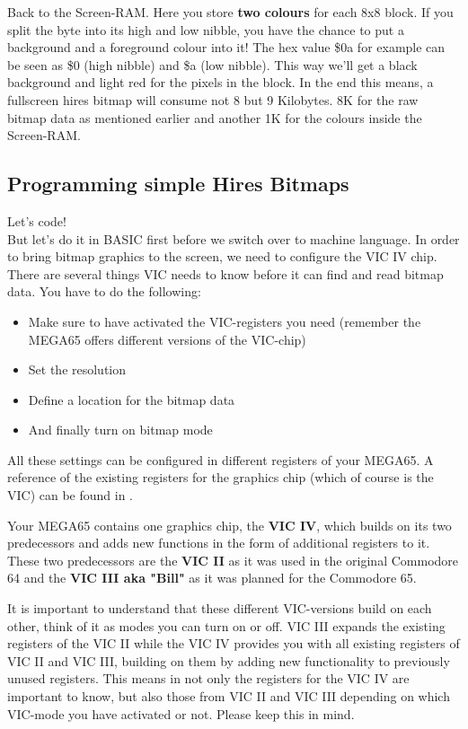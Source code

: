 Back to the Screen-RAM. Here you store \textbf{two colours} for each 8x8 block. If you split the byte into its high and low nibble, you have the chance to put a background and a foreground colour into it! The hex value \$0a for example can be seen as \$0 (high nibble) and \$a (low nibble). This way we'll get a black background and light red for the pixels in the block. In the end this means, a fullscreen hires bitmap will consume not 8 but 9 Kilobytes. 8K for the raw bitmap data as mentioned earlier and another 1K for the colours inside the Screen-RAM.\\

\subsection*{Programming simple Hires Bitmaps}
Let's code! \\
But let's do it in BASIC first before we switch over to machine language. In order to bring bitmap graphics to the screen, we need to configure the VIC IV chip. There are several things VIC needs to know before it can find and read bitmap data. You have to do the following:

\begin{itemize}
	\item Make sure to have activated the VIC-registers you need (remember the MEGA65 offers different versions of the VIC-chip)
	\item Set the resolution
	\item Define a location for the bitmap data 
	\item And finally turn on bitmap mode
\end{itemize}

All these settings can be configured in different registers of your MEGA65. A reference of the existing registers for the graphics chip (which of course is the VIC) can be found in . 

Your MEGA65 contains one graphics chip, the \textbf{VIC IV}, which builds on its two predecessors and adds new functions in the form of additional registers to it. These two predecessors are the \textbf{VIC II} as it was used in the original Commodore 64 and the \textbf{VIC III aka "Bill"} as it was planned for the Commodore 65. 

It is important to understand that these different VIC-versions build on each other, think of it as modes you can turn on or off.
VIC III expands the existing registers of the VIC II while the VIC IV provides you with all existing registers of VIC II and VIC III, building on them by adding new functionality to previously unused registers. This means in  not only the registers for the VIC IV are important to know, but also those from VIC II and VIC III depending on which VIC-mode you have activated or not. Please keep this in mind.

